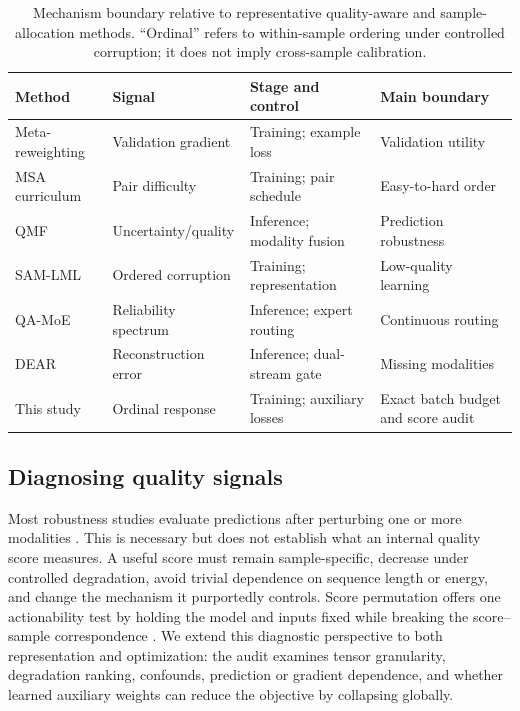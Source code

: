 \begin{table}[t]
\caption{Mechanism boundary relative to representative quality-aware and
sample-allocation methods. ``Ordinal'' refers to within-sample ordering under
controlled corruption; it does not imply cross-sample calibration.}
\label{tab:related-boundary}
\centering
\small
\setlength{\tabcolsep}{4pt}
\begin{tabularx}{\textwidth}{lYYY}
\toprule
Method & Signal & Stage and control & Main boundary \\
\midrule
Meta-reweighting \cite{ren2018reweight} & Validation gradient & Training; example loss & Validation utility \\
MSA curriculum \cite{mai2022curriculum} & Pair difficulty & Training; pair schedule & Easy-to-hard order \\
QMF \cite{zhang2023qmf} & Uncertainty/quality & Inference; modality fusion & Prediction robustness \\
SAM-LML \cite{mai2025samlml} & Ordered corruption & Training; representation & Low-quality learning \\
QA-MoE \cite{zhu2026qamoe} & Reliability spectrum & Inference; expert routing & Continuous routing \\
DEAR \cite{zou2026dear} & Reconstruction error & Inference; dual-stream gate & Missing modalities \\
This study & Ordinal response & Training; auxiliary losses & Exact batch budget and score audit \\
\bottomrule
\end{tabularx}
\end{table}

\subsection{Diagnosing quality
signals}\label{diagnosing-quality-signals}

Most robustness studies evaluate predictions after perturbing one or
more modalities \cite{hazarika2022robustness}. This is necessary but
does not establish what an internal quality score measures. A useful
score must remain sample-specific, decrease under controlled
degradation, avoid trivial dependence on sequence length or energy, and
change the mechanism it purportedly controls. Score permutation offers
one actionability test by holding the model and inputs fixed while
breaking the score--sample correspondence \cite{moon2026quality}. We
extend this diagnostic perspective to both representation and
optimization: the audit examines tensor granularity, degradation
ranking, confounds, prediction or gradient dependence, and whether
learned auxiliary weights can reduce the objective by collapsing
globally.

